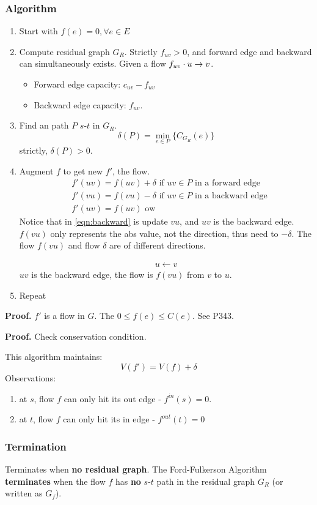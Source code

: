 \documentclass[a4paper]{report}
\theoremstyle{definition}
\begin{document}
\subsubsection{Algorithm}
\begin{enumerate}
\item Start with $f(e)=0, \forall e \in E$
\item Compute residual graph $G_R$. Strictly $f_{uv}>0$, and forward edge and backward can simultaneously exists. Given a flow $f_{uv} \cdot u \rightarrow v$.
\begin{itemize}
\item Forward edge capacity: $c_{uv}-f_{uv}$
\item Backward edge capacity: $f_{uv}$.
\end{itemize}
\item Find an path $P$ $s$-$t$ in $G_R$.
$$\delta(P)=\min_{e\in P} \{C_{G_R}(e)\}$$
strictly, $\delta(P)>0$.
\item Augment $f$ to get new $f'$, the flow.
\begin{align}
& f'(uv)= f(uv)+\delta \text{ if $uv\in P$ in a forward edge}\\
& f'(vu)= f(vu)-\delta \text{ if $uv \in P$ in a backward edge} \label{eqn:backward}\\
& f'(uv)=f(uv) \text{ ow}
\end{align}
Notice that in \ref{eqn:backward} is update $vu$, and $uv$ is the backward edge. $f(vu)$ only represents the abs value, not the direction, thus need to $-\delta$. The flow $f(vu)$ and flow $\delta$ are of different directions.


\begin{align*}
u \leftarrow v
\end{align*}
$uv$ is the backward edge, the flow is $f(vu)$ from $v$ to $u$. 
\item Repeat
\end{enumerate}
\textbf{Proof.} $f'$ is a flow in $G$. The $0\leq f(e)\leq C(e)$. See P343.

\textbf{Proof.} Check conservation condition.


This algorithm maintains:
$$
V(f')= V(f)+\delta
$$
Observations:
\begin{enumerate}
\item at $s$, flow $f$ can only hit its out edge - $f^{in}(s)=0$.
\item at $t$, flow $f$ can only hit its in edge - $f^{out}(t)=0$
\end{enumerate}
\subsubsection{Termination}
Terminates when \textbf{no residual graph}. The Ford-Fulkerson Algorithm \textbf{terminates}
when the flow $f$ has \textbf{no} $s$-$t$ path in the residual graph $G_R$ (or written
as $G_f$).
\end{document}
